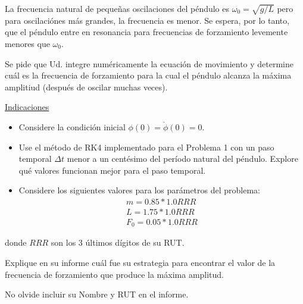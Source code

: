 \documentclass[letter, 11pt]{article}
\begin{document}
La frecuencia natural de pequeñas oscilaciones del péndulo es
$\omega_0=\sqrt{g/L}$ pero para oscilaciónes más grandes, la frecuencia es
menor. Se espera, por lo tanto, que el péndulo entre en resonancia para
frecuencias de forzamiento levemente menores que $\omega_0$.

Se pide que Ud. integre numéricamente la ecuación de movimiento y determine
cuál es la frecuencia de forzamiento para la cual el péndulo alcanza la máxima
amplitiud (después de oscilar muchas veces).

\vspace{0.5em}
\noindent\underline{Indicaciones}

\begin{itemize}
  \item Considere la condición inicial $\phi(0) = \dot{\phi}(0) = 0$.
  \item Use el método de RK4 implementado para el Problema 1 con un paso
    temporal $\Delta t$ menor a un centésimo del período natural del péndulo.
    Explore qué valores funcionan mejor para el paso temporal.
  \item Considere los siguientes valores para los parámetros del problema:
    \begin{align*}
      m = 0.85 * 1.0RRR \\
      L = 1.75 * 1.0RRR \\
      F_0 = 0.05 * 1.0RRR
    \end{align*}
\end{itemize}

donde $RRR$ son los 3 últimos dígitos de su RUT.

Explique en su informe cuál fue su estrategia para encontrar el valor de la
frecuencia de forzamiento que produce la máxima amplitud.

\begin{ayuda}
  \small
  No olvide incluir su Nombre y RUT en el informe.
\end{ayuda}
\end{document}
